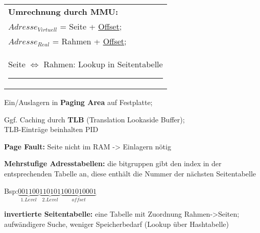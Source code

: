 \begin{tabular}[width=\textwidth]{|l|}
\hline
\textbf{Umrechnung durch MMU: }\\
$Adresse_{Virtuell}$ = Seite + \underline{Offset};\\
$Adresse_{Real}$ = Rahmen + \underline{Offset};\\
Seite $\Leftrightarrow$ Rahmen: Lookup in Seitentabelle \rule{0.25\textwidth}{0em} \\
\hline
\end{tabular}

Ein/Auslagern in \textbf{Paging Area} auf Festplatte;

Ggf. Caching durch \textbf{TLB} (Translation Lookaside Buffer); \\
TLB-Einträge beinhalten PID

\textbf{Page Fault:} Seite nicht im RAM -> Einlagern nötig

\textbf{Mehrstufige Adresstabellen:} die bitgruppen gibt den index in der entsprechenden Tabelle an, diese enthält die Nummer der nächsten Seitentabelle 

Bsp:$ \underbrace{001100}_{1.Level}\underbrace{110101}_{2.Level}\underbrace{1001010001}_{offset}$

\textbf{invertierte Seitentabelle:} eine Tabelle mit Zuordnung Rahmen->Seiten; aufwändigere Suche, weniger Speicherbedarf (Lookup über Hashtabelle)

\stopwashere

